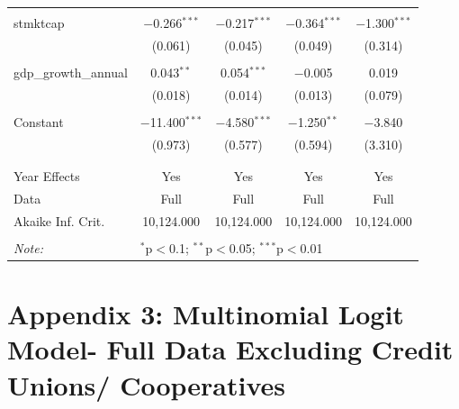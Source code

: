 \documentclass[a4paper,nobind]{templates/ociamthesis}
\begin{document}
\begin{table}[!htbp]
\begin{tabular}{@{\extracolsep{5pt}}lcccc}
  & & & & \\ 
 stmktcap & $-$0.266$^{***}$ & $-$0.217$^{***}$ & $-$0.364$^{***}$ & $-$1.300$^{***}$ \\ 
  & (0.061) & (0.045) & (0.049) & (0.314) \\ 
  & & & & \\ 
 gdp\_growth\_annual & 0.043$^{**}$ & 0.054$^{***}$ & $-$0.005 & 0.019 \\ 
  & (0.018) & (0.014) & (0.013) & (0.079) \\ 
  & & & & \\ 
 Constant & $-$11.400$^{***}$ & $-$4.580$^{***}$ & $-$1.250$^{**}$ & $-$3.840 \\ 
  & (0.973) & (0.577) & (0.594) & (3.310) \\ 
  & & & & \\ 
\hline \\[-1.8ex] 
Year Effects & Yes & Yes & Yes & Yes \\ 
Data & Full & Full & Full & Full \\ 
Akaike Inf. Crit. & 10,124.000 & 10,124.000 & 10,124.000 & 10,124.000 \\ 
\hline 
\hline \\[-1.8ex] 
\textit{Note:}  & \multicolumn{4}{l}{$^{*}$p$<$0.1; $^{**}$p$<$0.05; $^{***}$p$<$0.01} \\ 
\end{tabular} 
\end{table}

\newpage

\hypertarget{appendix-3-multinomial-logit-model--full-data-excluding-credit-unions-cooperatives}{%
\section{Appendix 3: Multinomial Logit Model- Full Data Excluding Credit Unions/ Cooperatives}\label{appendix-3-multinomial-logit-model--full-data-excluding-credit-unions-cooperatives}}
\end{document}

